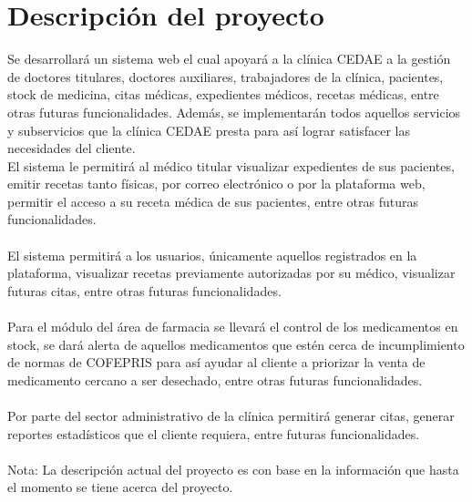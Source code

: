 \documentclass[12pt,letterpaper]{article}
\begin{document}
    \section{Descripción del proyecto}
    \justify
                Se desarrollará un sistema web el cual apoyará a la clínica CEDAE a la gestión de doctores titulares,
                doctores auxiliares, trabajadores de la clínica, pacientes, stock de medicina, citas médicas, expedientes médicos,
                recetas médicas, entre otras futuras funcionalidades.
                Además, se implementarán todos aquellos servicios y subservicios que la clínica CEDAE presta para así lograr satisfacer
                las necesidades del cliente.
                \\
                El sistema le permitirá al médico titular visualizar expedientes de sus pacientes, emitir recetas tanto físicas,
                por correo electrónico o por la plataforma web, permitir el acceso a su receta médica de sus pacientes, entre otras futuras funcionalidades.
                \\\\
                El sistema permitirá a los usuarios, únicamente aquellos registrados en la plataforma, visualizar recetas previamente autorizadas por 
                su médico, visualizar futuras citas, entre otras futuras funcionalidades.
                \\\\
                Para el módulo del área de farmacia se llevará el control de los medicamentos en stock, se dará alerta de aquellos medicamentos que estén cerca de incumplimiento 
                de normas de COFEPRIS para así ayudar al cliente a priorizar la venta de medicamento cercano a ser desechado, entre otras futuras funcionalidades.
                \\\\
                Por parte del sector administrativo de la clínica permitirá generar citas, generar reportes estadísticos que el cliente requiera, entre futuras funcionalidades.
                \\\\
                Nota: La descripción actual del proyecto es con base en la información que hasta el momento se tiene acerca del proyecto.
\end{document}
